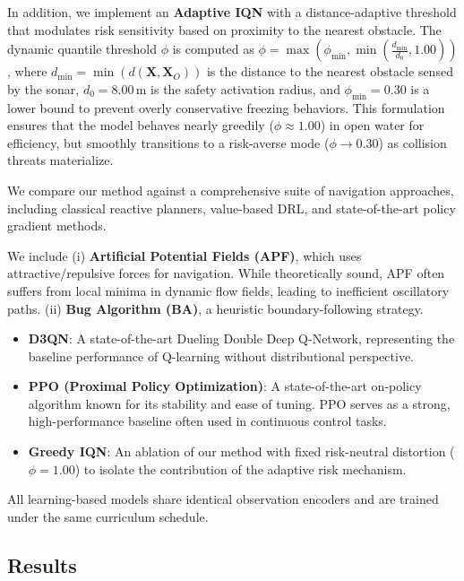 \documentclass[runningheads]{llncs}
\begin{document}
In addition, we implement an \textbf{Adaptive IQN} with a distance-adaptive threshold that modulates risk sensitivity based on proximity to the nearest obstacle. The dynamic quantile threshold $\phi$ is computed as $\phi = \max\left( \phi_{\min}, \min\left( \frac{d_{\min}}{d_0}, 1.00 \right) \right)$, where $d_{\min} = \min(d(\mathbf{X}, \mathbf{X}_O))$ is the distance to the nearest obstacle sensed by the sonar, $d_0=8.00$\,m is the safety activation radius, and $\phi_{\min}=0.30$ is a lower bound to prevent overly conservative freezing behaviors. This formulation ensures that the model behaves nearly greedily ($\phi \approx 1.00$) in open water for efficiency, but smoothly transitions to a risk-averse mode ($\phi \to 0.30$) as collision threats materialize.

We compare our method against a comprehensive suite of navigation approaches, including classical reactive planners, value-based DRL, and state-of-the-art policy gradient methods.

We include (i) \textbf{Artificial Potential Fields (APF)}, which uses attractive/repulsive forces for navigation. While theoretically sound, APF often suffers from local minima in dynamic flow fields, leading to inefficient oscillatory paths.
(ii) \textbf{Bug Algorithm (BA)}, a heuristic boundary-following strategy.

\begin{itemize}
    \item \textbf{D3QN}: A state-of-the-art Dueling Double Deep Q-Network, representing the baseline performance of Q-learning without distributional perspective.
    \item \textbf{PPO (Proximal Policy Optimization)}: A state-of-the-art on-policy algorithm known for its stability and ease of tuning. PPO serves as a strong, high-performance baseline often used in continuous control tasks.
    \item \textbf{Greedy IQN}: An ablation of our method with fixed risk-neutral distortion ($\phi=1.00$) to isolate the contribution of the adaptive risk mechanism.
\end{itemize}

All learning-based models share identical observation encoders and are trained under the same curriculum schedule.

\subsection{Results}
\label{sec:results}
\end{document}
